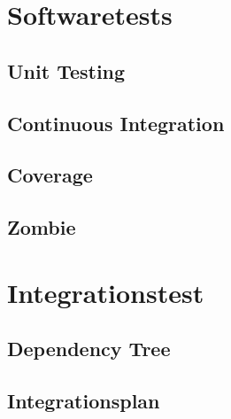 \documentclass[Rapport/Rapport_main.tex]{subfiles}
\begin{document}
\section{Softwaretests}
\subsection{Unit Testing}
\subsection{Continuous Integration}
\subsection{Coverage}
\subsection{Zombie}
\section{Integrationstest}
\subsection{Dependency Tree}
\subsection{Integrationsplan}
\end{document}
